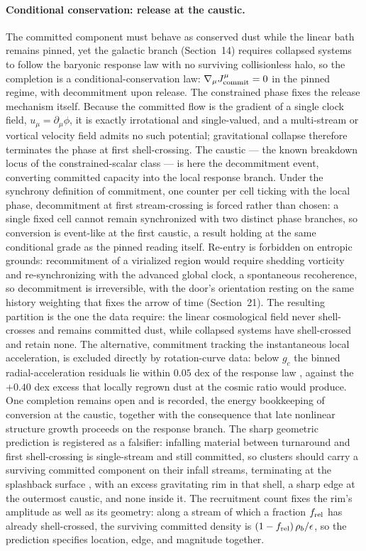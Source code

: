\documentclass[11pt]{article}
\begin{document}
\paragraph{Conditional conservation: release at the caustic.}
The committed component must behave as conserved dust while the linear bath remains pinned, yet the galactic branch (Section~14) requires collapsed systems to follow the baryonic response law with no surviving collisionless halo, so the completion is a conditional-conservation law: $\nabla_\mu J^\mu_{\rm commit}=0$ in the pinned regime, with decommitment upon release. The constrained phase fixes the release mechanism itself. Because the committed flow is the gradient of a single clock field, $u_\mu=\partial_\mu\phi$, it is exactly irrotational and single-valued, and a multi-stream or vortical velocity field admits no such potential; gravitational collapse therefore terminates the phase at first shell-crossing. The caustic --- the known breakdown locus of the constrained-scalar class --- is here the decommitment event, converting committed capacity into the local response branch. Under the synchrony definition of commitment, one counter per cell ticking with the local phase, decommitment at first stream-crossing is forced rather than chosen: a single fixed cell cannot remain synchronized with two distinct phase branches, so conversion is event-like at the first caustic, a result holding at the same conditional grade as the pinned reading itself. Re-entry is forbidden on entropic grounds: recommitment of a virialized region would require shedding vorticity and re-synchronizing with the advanced global clock, a spontaneous recoherence, so decommitment is irreversible, with the door's orientation resting on the same history weighting that fixes the arrow of time (Section~21). The resulting partition is the one the data require: the linear cosmological field never shell-crosses and remains committed dust, while collapsed systems have shell-crossed and retain none. The alternative, commitment tracking the instantaneous local acceleration, is excluded directly by rotation-curve data: below $g_c$ the binned radial-acceleration residuals lie within $0.05$ dex of the response law \citep{McGaugh2016}, against the $+0.40$ dex excess that locally regrown dust at the cosmic ratio would produce. One completion remains open and is recorded, the energy bookkeeping of conversion at the caustic, together with the consequence that late nonlinear structure growth proceeds on the response branch. The sharp geometric prediction is registered as a falsifier: infalling material between turnaround and first shell-crossing is single-stream and still committed, so clusters should carry a surviving committed component on their infall streams, terminating at the splashback surface \citep{More2015}, with an excess gravitating rim in that shell, a sharp edge at the outermost caustic, and none inside it. The recruitment count fixes the rim's amplitude as well as its geometry: along a stream of which a fraction $f_{\rm rel}$ has already shell-crossed, the surviving committed density is $(1-f_{\rm rel})\,\rho_b/\epsilon$, so the prediction specifies location, edge, and magnitude together.
\end{document}
